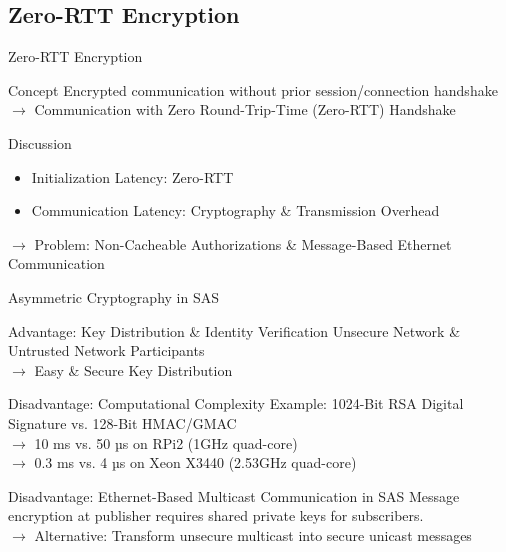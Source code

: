 \documentclass[en]{sdqbeamer}
\begin{document}
\subsection{Zero-RTT Encryption}
\begin{frame}{Zero-RTT Encryption}
    \begin{greenblock}{Concept}
        Encrypted communication without prior session/connection handshake
        \\$\rightarrow$ Communication with Zero Round-Trip-Time (Zero-RTT) Handshake
    \end{greenblock}

    \begin{blueblock}{Discussion}
        \begin{itemize}
            \item Initialization Latency: Zero-RTT
            \item Communication Latency: Cryptography \& Transmission Overhead
        \end{itemize}
        $\rightarrow$ Problem: Non-Cacheable Authorizations \& Message-Based Ethernet Communication
    \end{blueblock}
\end{frame}

\begin{frame}{Asymmetric Cryptography in SAS}
    \begin{greenblock}{Advantage: Key Distribution \& Identity Verification}
        Unsecure Network \& Untrusted Network Participants
        \\$\rightarrow$ Easy \& Secure Key Distribution
    \end{greenblock}
    \begin{redblock}{Disadvantage: Computational Complexity \parencite{Elbez2019,Ishchenko2018}}
        Example: 1024-Bit RSA Digital Signature vs. 128-Bit HMAC/GMAC
        \\$\rightarrow$ 10 ms vs. 50 µs on RPi2 (1GHz quad-core)
        \\$\rightarrow$ 0.3 ms vs. 4 µs on Xeon X3440 (2.53GHz quad-core) 
    \end{redblock}
    \begin{redblock}{Disadvantage: Ethernet-Based Multicast Communication in SAS}
        Message encryption at publisher requires shared private keys for subscribers.
        \\$\rightarrow$ Alternative: Transform unsecure multicast into secure unicast messages
    \end{redblock}
\end{frame}
\end{document}
